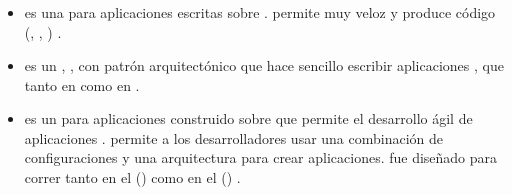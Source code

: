 	\subsubsection{\isomorphicJSFwASref}
	\begin{itemize}
		\item
			\textbf{\meteorNAME} es una \frameworkPC  \openSourcePC \realTimeINT para aplicaciones \webINT \javaScriptNAME escritas sobre \nodejsNAME \cite{online_meteor_documentation}. \meteorNAME permite \prototypingCPT muy veloz \cite{online_meteor_documentation_why} y produce código \crossPlatform (\webINT, \androidNAME, \iosNAME) \cite{online_meteor_cross_platform}.

		\item
			\textbf{\derbyNAME} \cite{online_technology_derby_officialsite} es un \frameworkPC \fullstackAS, \isomorphicAS, con patrón arquitectónico \mvcAS que hace sencillo escribir aplicaciones \collaborativeQA, \realTimeINT que \runCPT tanto en \nodejsNAME como en \browsersINT \cite{online_technology_isomorphic_javascript_frameworks}.
		
		\item
			\textbf{\mojitoNAME} es un \frameworkPC para aplicaciones \mvcAS construido sobre \yuiThreeNAME que permite el desarrollo ágil de aplicaciones \webINT. \mojitoNAME permite a los desarrolladores usar una combinación de configuraciones y una arquitectura \mvcAS para crear aplicaciones. \mojitoNAME fue diseñado para correr tanto en el \serverSideAS (\nodejsNAME) como en el \clientAS (\browserINT) \cite{online_technology_mojito_officialsite_docs_intro}.


\end{itemize}
